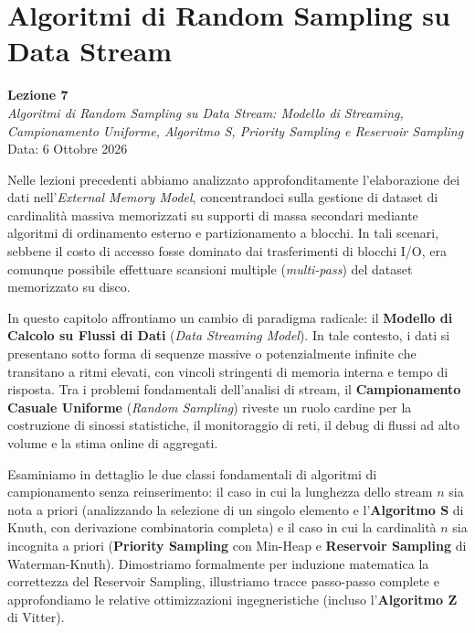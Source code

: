 \chapter{Algoritmi di Random Sampling su Data Stream}
\label{chap:random-sampling-data-streams}

\begin{center}
  \textbf{Lezione 7}\\
  \emph{Algoritmi di Random Sampling su Data Stream: Modello di Streaming, Campionamento Uniforme, Algoritmo S, Priority Sampling e Reservoir Sampling}\\[0.5em]
  Data: 6 Ottobre 2026
\end{center}

Nelle lezioni precedenti abbiamo analizzato approfonditamente l'elaborazione dei dati nell'\textit{External Memory Model}, concentrandoci sulla gestione di dataset di cardinalità massiva memorizzati su supporti di massa secondari mediante algoritmi di ordinamento esterno e partizionamento a blocchi. In tali scenari, sebbene il costo di accesso fosse dominato dai trasferimenti di blocchi I/O, era comunque possibile effettuare scansioni multiple (\textit{multi-pass}) del dataset memorizzato su disco.

In questo capitolo affrontiamo un cambio di paradigma radicale: il \textbf{Modello di Calcolo su Flussi di Dati} (\textit{Data Streaming Model}). In tale contesto, i dati si presentano sotto forma di sequenze massive o potenzialmente infinite che transitano a ritmi elevati, con vincoli stringenti di memoria interna e tempo di risposta. Tra i problemi fondamentali dell'analisi di stream, il \textbf{Campionamento Casuale Uniforme} (\textit{Random Sampling}) riveste un ruolo cardine per la costruzione di sinossi statistiche, il monitoraggio di reti, il debug di flussi ad alto volume e la stima online di aggregati.

Esaminiamo in dettaglio le due classi fondamentali di algoritmi di campionamento senza reinserimento: il caso in cui la lunghezza dello stream $n$ sia nota a priori (analizzando la selezione di un singolo elemento e l'\textbf{Algoritmo S} di Knuth, con derivazione combinatoria completa) e il caso in cui la cardinalità $n$ sia incognita a priori (\textbf{Priority Sampling} con Min-Heap e \textbf{Reservoir Sampling} di Waterman-Knuth). Dimostriamo formalmente per induzione matematica la correttezza del Reservoir Sampling, illustriamo tracce passo-passo complete e approfondiamo le relative ottimizzazioni ingegneristiche (incluso l'\textbf{Algoritmo Z} di Vitter).

